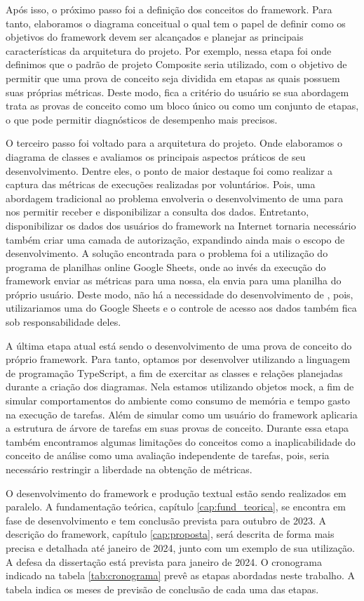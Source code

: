 \documentclass[12pt]{tcc}
\begin{document}
Após isso, o próximo passo foi a definição dos conceitos do framework.
Para tanto, elaboramos o diagrama conceitual o qual tem o papel de definir como os objetivos do framework devem ser alcançados e planejar as principais características da arquitetura do projeto.
Por exemplo, nessa etapa foi onde definimos que o padrão de projeto Composite seria utilizado, com o objetivo de permitir que uma prova de conceito seja dividida em etapas as quais possuem suas próprias métricas.
Deste modo, fica a critério do usuário se sua abordagem trata as provas de conceito como um bloco único ou como um conjunto de etapas, o que pode permitir diagnósticos de desempenho mais precisos.

O terceiro passo foi voltado para a arquitetura do projeto.
Onde elaboramos o diagrama de classes e avaliamos os principais aspectos práticos de seu desenvolvimento.
Dentre eles, o ponto de maior destaque foi como realizar a captura das métricas de execuções realizadas por voluntários.
Pois, uma abordagem tradicional ao problema envolveria o desenvolvimento de uma  para nos permitir receber e disponibilizar a consulta dos dados.
Entretanto, disponibilizar os dados dos usuários do framework na Internet tornaria necessário também criar uma camada de autorização, expandindo ainda mais o escopo de desenvolvimento.
A solução encontrada para o problema foi a utilização do programa de planilhas online Google Sheets, onde ao invés da execução do framework enviar as métricas para uma  nossa, ela envia para uma planilha do próprio usuário.
Deste modo, não há a necessidade do desenvolvimento de , pois, utilizariamos uma do Google Sheets e o controle de acesso aos dados também fica sob responsabilidade deles.

A última etapa atual está sendo o desenvolvimento de uma prova de conceito do próprio framework.
Para tanto, optamos por desenvolver utilizando a linguagem de programação TypeScript, a fim de exercitar as classes e relações planejadas durante a criação dos diagramas.
Nela estamos utilizando objetos mock, a fim de simular comportamentos do ambiente como consumo de memória e tempo gasto na execução de tarefas.
Além de simular como um usuário do framework aplicaria a estrutura de árvore de tarefas em suas provas de conceito.
Durante essa etapa também encontramos algumas limitações do conceitos como a inaplicabilidade do conceito de análise como uma avaliação independente de tarefas, pois, seria necessário restringir a liberdade na obtenção de métricas.

O desenvolvimento do framework e produção textual estão sendo realizados em paralelo.
A fundamentação teórica, capítulo \ref{cap:fund_teorica}, se encontra em fase de desenvolvimento e tem conclusão prevista para outubro de 2023.
A descrição do framework, capítulo \ref{cap:proposta}, será descrita de forma mais precisa e detalhada até janeiro de 2024, junto com um exemplo de sua utilização.
A defesa da dissertação está prevista para janeiro de 2024. O cronograma indicado na tabela \ref{tab:cronograma} prevê as etapas abordadas neste trabalho.
A tabela indica os meses de previsão de conclusão de cada uma das etapas.
\end{document}
